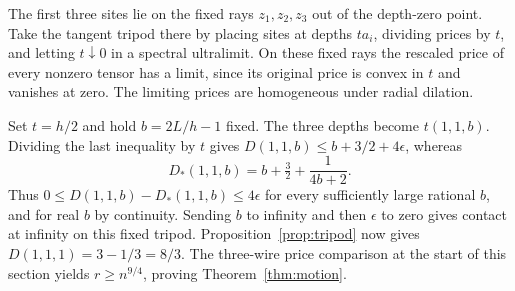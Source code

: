 The first three sites lie on the fixed rays \(z_1,z_2,z_3\) out of
the depth-zero point. Take the tangent tripod there by placing sites
at depths \(t a_i\), dividing prices by \(t\), and letting \(t\downarrow0\)
in a spectral ultralimit. On these fixed rays the rescaled price of
every nonzero tensor has a limit, since its original price is convex
in \(t\) and vanishes at zero. The limiting prices are homogeneous
under radial dilation.

Set \(t=h/2\) and hold \(b=2L/h-1\) fixed. The three depths become
\(t(1,1,b)\). Dividing the last inequality by \(t\) gives
\(D(1,1,b)\le b+3/2+4\epsilon\), whereas
\[
             D_*(1,1,b)=b+\tfrac32+\frac{1}{4b+2}.
\]
Thus \(0\le D(1,1,b)-D_*(1,1,b)\le4\epsilon\) for every sufficiently
large rational \(b\), and for real \(b\) by continuity. Sending \(b\)
to infinity and then \(\epsilon\) to zero gives contact at infinity
on this fixed tripod. Proposition~\ref{prop:tripod} now gives
\(D(1,1,1)=3-1/3=8/3\). The three-wire price comparison at the start
of this section yields \(r\ge n^{9/4}\), proving Theorem~\ref{thm:motion}.
